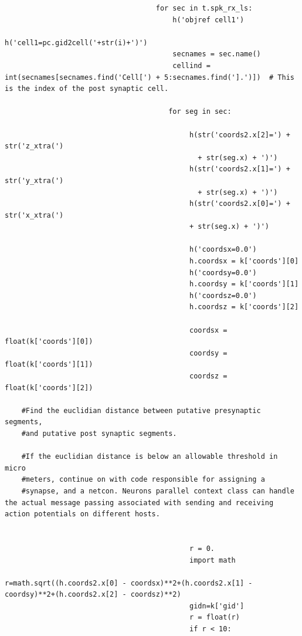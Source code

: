 \documentclass[a4paper,11pt]{article}
\begin{document}
\begin{verbatim}
                                    for sec in t.spk_rx_ls:
                                        h('objref cell1')
                                        h('cell1=pc.gid2cell('+str(i)+')')
                                        secnames = sec.name()
                                        cellind = int(secnames[secnames.find('Cell[') + 5:secnames.find('].')])  # This is the index of the post synaptic cell.
 
                                       for seg in sec:
                                            
                                            h(str('coords2.x[2]=') + str('z_xtra(')
                                              + str(seg.x) + ')')
                                            h(str('coords2.x[1]=') + str('y_xtra(')
                                              + str(seg.x) + ')')
                                            h(str('coords2.x[0]=') + str('x_xtra(')
                                            + str(seg.x) + ')')
        
                                            h('coordsx=0.0')
                                            h.coordsx = k['coords'][0]
                                            h('coordsy=0.0')
                                            h.coordsy = k['coords'][1]
                                            h('coordsz=0.0')
                                            h.coordsz = k['coords'][2]
                              
                                            coordsx = float(k['coords'][0])
                                            coordsy = float(k['coords'][1])
                                            coordsz = float(k['coords'][2])

    #Find the euclidian distance between putative presynaptic segments, 
    #and putative post synaptic segments.

    #If the euclidian distance is below an allowable threshold in micro 
    #meters, continue on with code responsible for assigning a 
    #synapse, and a netcon. Neurons parallel context class can handle the actual message passing associated with sending and receiving action potentials on different hosts.                               


                                            r = 0.
                                            import math
                                            r=math.sqrt((h.coords2.x[0] - coordsx)**2+(h.coords2.x[1] - coordsy)**2+(h.coords2.x[2] - coordsz)**2)
                                            gidn=k['gid']    
                                            r = float(r)
                                            if r < 10:  
    

\end{verbatim}
\end{document}
